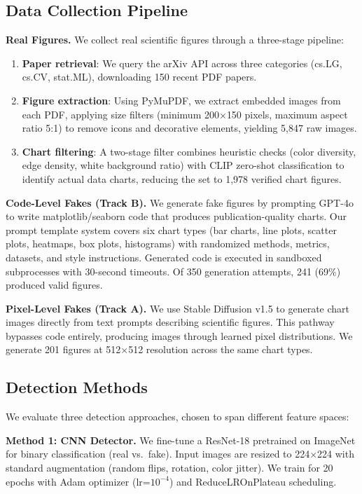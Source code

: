 \documentclass[11pt]{article}
\begin{document}
\subsection{Data Collection Pipeline}

\textbf{Real Figures.} We collect real scientific figures through a three-stage pipeline:
\begin{enumerate}
    \item \textbf{Paper retrieval}: We query the arXiv API across three categories (cs.LG, cs.CV, stat.ML), downloading 150 recent PDF papers.
    \item \textbf{Figure extraction}: Using PyMuPDF, we extract embedded images from each PDF, applying size filters (minimum 200$\times$150 pixels, maximum aspect ratio 5:1) to remove icons and decorative elements, yielding 5,847 raw images.
    \item \textbf{Chart filtering}: A two-stage filter combines heuristic checks (color diversity, edge density, white background ratio) with CLIP zero-shot classification to identify actual data charts, reducing the set to 1,978 verified chart figures.
\end{enumerate}

\textbf{Code-Level Fakes (Track B).} We generate fake figures by prompting GPT-4o to write matplotlib/seaborn code that produces publication-quality charts. Our prompt template system covers six chart types (bar charts, line plots, scatter plots, heatmaps, box plots, histograms) with randomized methods, metrics, datasets, and style instructions. Generated code is executed in sandboxed subprocesses with 30-second timeouts. Of 350 generation attempts, 241 (69\%) produced valid figures.

\textbf{Pixel-Level Fakes (Track A).} We use Stable Diffusion v1.5 to generate chart images directly from text prompts describing scientific figures. This pathway bypasses code entirely, producing images through learned pixel distributions. We generate 201 figures at 512$\times$512 resolution across the same chart types.

\subsection{Detection Methods}

We evaluate three detection approaches, chosen to span different feature spaces:

\textbf{Method 1: CNN Detector.} We fine-tune a ResNet-18 pretrained on ImageNet for binary classification (real vs.\ fake). Input images are resized to 224$\times$224 with standard augmentation (random flips, rotation, color jitter). We train for 20 epochs with Adam optimizer (lr=$10^{-4}$) and ReduceLROnPlateau scheduling.
\end{document}
